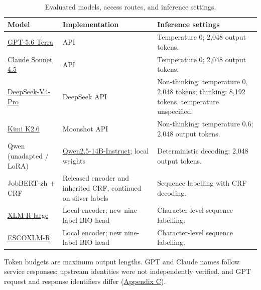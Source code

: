 \begin{table}[!htbp]
\centering\small
\caption{Evaluated models, access routes, and inference settings.}
\label{tab:model-identity}
\begin{tabularx}{\linewidth}{@{}P{.22\linewidth}P{.32\linewidth}L@{}}
\toprule
Model & Implementation & Inference settings \\
\midrule
\href{https://developers.openai.com/api/docs/models/gpt-5.6-terra}{GPT-5.6 Terra} & API & Temperature 0; 2,048 output tokens. \\
\href{https://platform.claude.com/docs/en/about-claude/models/model-ids-and-versions}{Claude Sonnet 4.5} & API & Temperature 0; 2,048 output tokens. \\
\href{https://api-docs.deepseek.com/news/news260813/}{DeepSeek-V4-Pro} & DeepSeek API & Non-thinking: temperature 0, 2,048 tokens; thinking: 8,192 tokens, temperature unspecified. \\
\href{https://platform.kimi.com/docs/guide/kimi-k2-6-quickstart}{Kimi K2.6} & Moonshot API & Non-thinking; temperature 0.6; 2,048 output tokens. \\
Qwen (unadapted / LoRA) & \href{https://huggingface.co/Qwen/Qwen2.5-14B-Instruct}{Qwen2.5-14B-Instruct}; local weights & Deterministic decoding; 2,048 output tokens. \\
JobBERT-zh + CRF & Released encoder and inherited CRF, continued on silver labels & Sequence labelling with CRF decoding. \\
\href{https://huggingface.co/FacebookAI/xlm-roberta-large}{XLM-R-large} & Local encoder; new nine-label BIO head & Character-level sequence labelling. \\
\href{https://huggingface.co/jjzha/esco-xlm-roberta-large}{ESCOXLM-R} & Local encoder; new nine-label BIO head & Character-level sequence labelling. \\
\bottomrule
\end{tabularx}
\par\smallskip\footnotesize\RaggedRight
Token budgets are maximum output lengths. GPT and Claude names follow service responses; upstream identities were not independently verified, and GPT request and response identifiers differ (\hyperref[app:c]{Appendix C}).
\end{table}
